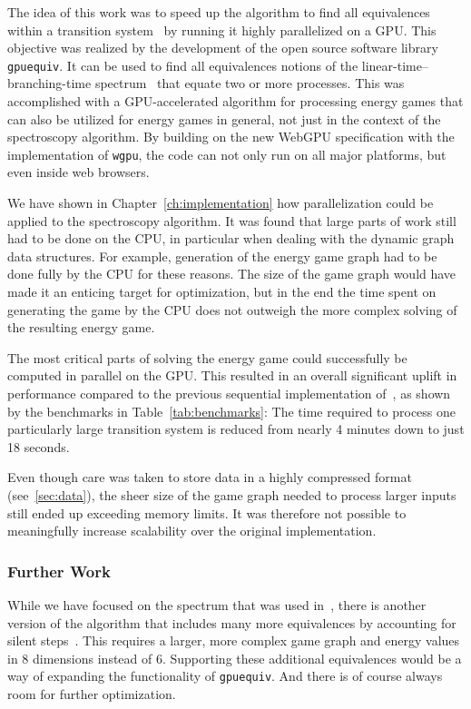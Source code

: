 The idea of this work was to speed up the algorithm to find all equivalences
within a transition system~\cite{bisping2023process} by running it highly
parallelized on a GPU\@.
This objective was realized by the development of the open source software
library \texttt{gpuequiv}.
It can be used to find all equivalences notions of the
linear-time--branching-time spectrum~\cite{glabbeek1990spectrum}
that equate two or more processes.
This was accomplished with a GPU-accelerated algorithm for processing energy
games that can also be utilized for energy games in general,
not just in the context of the spectroscopy algorithm.
By building on the new WebGPU specification with the implementation of
\texttt{wgpu},
the code can not only run on all major platforms,
but even inside web browsers.

We have shown in Chapter~\ref{ch:implementation} how parallelization could be
applied to the spectroscopy algorithm.
It was found that large parts of work still had to be done on the CPU,
in particular when dealing with the dynamic graph data structures.
For example, generation of the energy game graph had to be done
fully by the CPU for these reasons.
The size of the game graph would have made it an enticing target for
optimization,
but in the end the time spent on generating the game by the CPU does not
outweigh the more complex solving of the resulting energy game.

The most critical parts of solving the energy game could successfully be
computed in parallel on the GPU\@.
This resulted in an overall significant uplift in performance compared to the
previous sequential implementation of~\cite{bisping2023process},
as shown by the benchmarks in Table~\ref{tab:benchmarks}:
The time required to process one particularly large transition system is
reduced from nearly 4 minutes down to just 18 seconds.

Even though care was taken to store data in a highly compressed format
(see~\ref{sec:data}),
the sheer size of the game graph needed to process larger inputs still
ended up exceeding memory limits.
It was therefore not possible to meaningfully increase scalability
over the original implementation.

\subsubsection{Further Work}

While we have focused on the spectrum that was used
in~\cite{bisping2023process},
there is another version of the algorithm that includes many more equivalences
by accounting for silent steps~\cite{bisping2023silent}.
This requires a larger,
more complex game graph and energy values in 8 dimensions instead of 6.
Supporting these additional equivalences would be a way of expanding the
functionality of \texttt{gpuequiv}.
And there is of course always room for further optimization.
